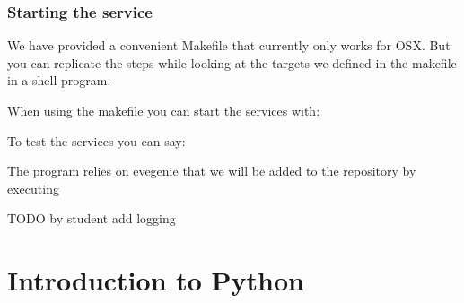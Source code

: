 \subsubsection{Starting the service}
\label{\detokenize{lesson/prg/rest:starting-the-service}}
We have provided a convenient Makefile that currently only works for
OSX. But you can replicate the steps while looking at the targets we
defined in the makefile in a shell program.

\begin{sphinxVerbatim}[commandchars=\\\{\}]
          
        
\end{sphinxVerbatim}

When using the makefile you can start the services with:

\begin{sphinxVerbatim}[commandchars=\\\{\}]
 
\end{sphinxVerbatim}

To test the services you can say:

\begin{sphinxVerbatim}[commandchars=\\\{\}]
 
\end{sphinxVerbatim}

The program relies on evegenie that we will be added to the repository
by executing

\begin{sphinxVerbatim}[commandchars=\\\{\}]
           
\end{sphinxVerbatim}

TODO by student add logging


\section{Introduction to Python}
\label{\detokenize{lesson/prg/python_intro:introduction-to-python}}\label{\detokenize{lesson/prg/python_intro::doc}}\label{\detokenize{lesson/prg/python_intro:python-intro}}

